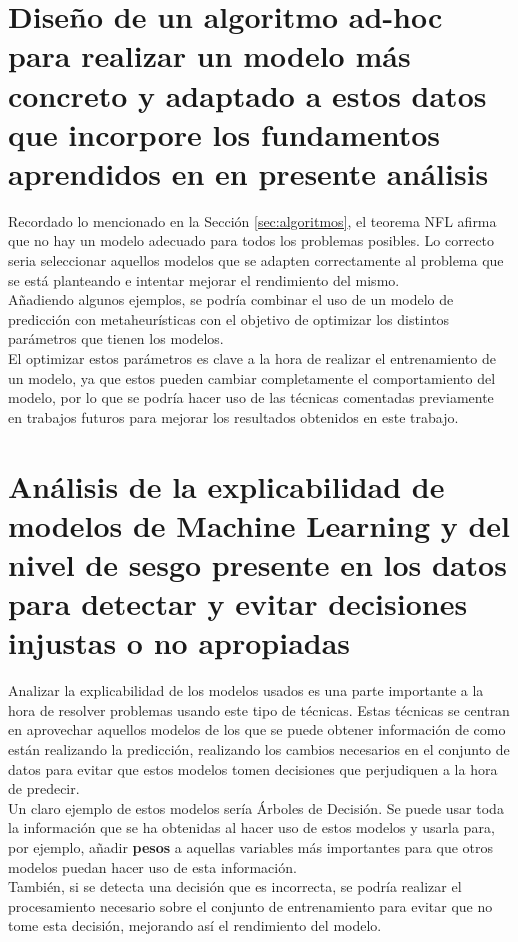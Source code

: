 \section*{Diseño de un algoritmo ad-hoc para realizar un modelo más concreto y adaptado a estos datos que incorpore los fundamentos aprendidos en en presente análisis}
Recordado lo mencionado en la Sección \ref{sec:algoritmos}, el teorema NFL afirma que no hay un modelo adecuado para todos los problemas posibles. Lo correcto seria seleccionar aquellos modelos que se adapten correctamente al problema que se está planteando e intentar mejorar el rendimiento del mismo.\\
\linebreak
Añadiendo algunos ejemplos, se podría combinar el uso de un modelo de predicción con metaheurísticas con el objetivo de optimizar los distintos parámetros que tienen los modelos.\\
El optimizar estos parámetros es clave a la hora de realizar el entrenamiento de un modelo, ya que estos pueden cambiar completamente el comportamiento del modelo, por lo que se podría hacer uso de las técnicas comentadas previamente en trabajos futuros para mejorar los resultados obtenidos en este trabajo.
\section*{Análisis de la explicabilidad de modelos de Machine Learning y del nivel de sesgo presente en los datos para detectar y evitar decisiones injustas o no apropiadas}
Analizar la explicabilidad de los modelos usados es una parte importante a la hora de resolver problemas usando este tipo de técnicas. Estas técnicas se centran en aprovechar aquellos modelos de los que se puede obtener información de como están realizando la predicción, realizando los cambios necesarios en el conjunto de datos para evitar que estos modelos  tomen decisiones que perjudiquen a la hora de predecir.\\
\linebreak
Un claro ejemplo de estos modelos sería Árboles de Decisión. Se puede usar toda la información que se ha obtenidas al hacer uso de estos modelos y usarla para, por ejemplo, añadir \textbf{pesos} a aquellas variables más importantes para que otros modelos puedan hacer uso de esta información.\\
También, si se detecta una decisión que es incorrecta, se podría realizar el procesamiento necesario sobre el conjunto de entrenamiento para evitar que no tome esta decisión, mejorando así el rendimiento del modelo.